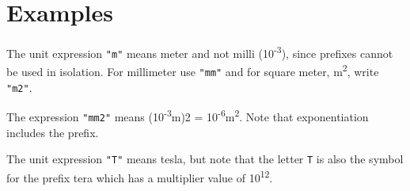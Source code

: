\section{Examples}\label{examples2}

The unit expression \lstinline!"m"! means meter and not milli
(10\textsuperscript{-3}), since prefixes cannot be used in isolation.
For millimeter use \lstinline!"mm"! and for square meter, m\textsuperscript{2}, write
\lstinline!"m2"!.

The expression \lstinline!"mm2"! means (10\textsuperscript{-3}m)2 =
10\textsuperscript{-6}m\textsuperscript{2}. Note that exponentiation
includes the prefix.

The unit expression \lstinline!"T"! means tesla, but note that the letter \lstinline!T! is
also the symbol for the prefix tera which has a multiplier value of
10\textsuperscript{12}.
